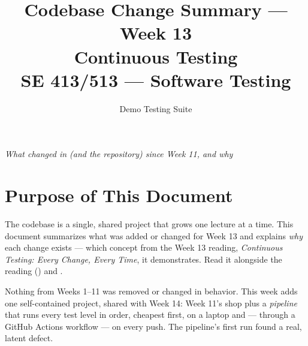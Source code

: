 \documentclass[11pt]{article}
\title{
  \textbf{Codebase Change Summary --- Week 13}\\[4pt]
  \large Continuous Testing\\[2pt]
  \normalsize SE 413/513 --- Software Testing
}
\author{Demo Testing Suite}
\date{}
\begin{document}
\maketitle

\begin{center}
\textit{What changed in  (and the repository) since Week 11, and why}
\end{center}

\vspace{0.3cm}

\section{Purpose of This Document}
The  codebase is a single, shared project that
grows one lecture at a time. This document summarizes what was added or
changed for Week 13 and explains \emph{why} each change exists --- which
concept from the Week 13 reading, \textit{Continuous Testing: Every
Change, Every Time}, it demonstrates. Read it alongside the reading
() and
.

\begin{keyidea}
Nothing from Weeks 1--11 was removed or changed in behavior. This week
adds one self-contained project, shared with Week 14: Week 11's shop
plus a \emph{pipeline} that runs every test level in order, cheapest
first, on a laptop and --- through a GitHub Actions workflow --- on
every push. The pipeline's first run found a real, latent defect.
\end{keyidea}

\end{document}

